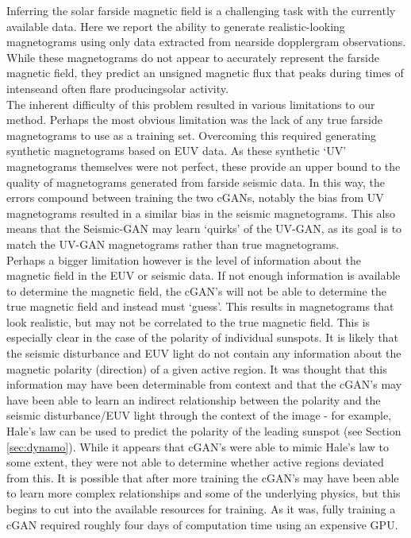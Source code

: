\documentclass[11pt,a4paper,onecolumn]{report}
\begin{document}
Inferring the solar farside magnetic field is a challenging task with the
currently available data. Here we report the ability to generate
realistic-looking magnetograms using only data extracted from nearside
dopplergram observations. While these magnetograms do not appear to accurately
represent the farside magnetic field, they predict an unsigned magnetic flux
that peaks during times of intense\textemdash and often flare
producing\textemdash solar activity.\\

The inherent difficulty of this problem resulted in various limitations to our
method. Perhaps the most obvious limitation was the lack of any true farside
magnetograms to use as a training set. Overcoming this required generating
synthetic magnetograms based on EUV data. As these synthetic `UV' magnetograms
themselves were not perfect, these provide an upper bound to the quality of
magnetograms generated from farside seismic data. In this way, the errors
compound between training the two cGANs, notably the bias from UV magnetograms
resulted in a similar bias in the seismic magnetograms. This also means that the
Seismic-GAN may learn `quirks' of the UV-GAN, as its goal is to match the UV-GAN
magnetograms rather than true magnetograms. \\ %

Perhaps a bigger limitation however is the level of information about the
magnetic field in the EUV or seismic data. If not enough information is
available to determine the magnetic field, the cGAN's will not be able to
determine the true magnetic field and instead must `guess'. This results in
magnetograms that look realistic, but may not be correlated to the true magnetic
field. This is especially clear in the case of the polarity of individual
sunspots. It is likely that the seismic disturbance and EUV light do not contain
any information about the magnetic polarity (direction) of a given active
region. It was thought that this information may have been determinable from
context and that the cGAN's may have been able to learn an indirect relationship
between the polarity and the seismic disturbance/EUV light through the context
of the image - for example, Hale's law can be used to predict the polarity of the
leading sunspot (see Section \ref{sec:dynamo}). While it appears that cGAN's
were able to mimic Hale's law to some extent, they were not able to determine
whether active regions deviated from this. It is possible that after more
training the cGAN's may have been able to learn more complex relationships and
some of the underlying physics, but this begins to cut into the available
resources for training. As it was, fully training a cGAN required roughly four
days of computation time using an expensive GPU. \\
\end{document}
